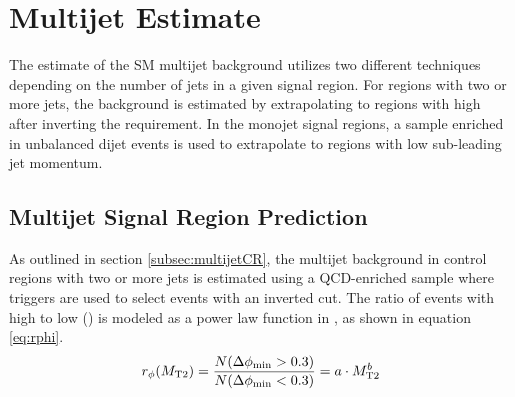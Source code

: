 \section{Multijet Estimate}
\label{sec:qcd}

The estimate of the SM multijet background utilizes two different techniques depending on the number of jets in a given signal region. For regions with two or more jets, the background is estimated by extrapolating to regions with high \dphimin after inverting the \dphimin requirement. In the monojet signal regions, a sample enriched in unbalanced dijet events is used to extrapolate to regions with low sub-leading jet momentum.

\subsection{Multijet Signal Region Prediction}
\label{subsec:qcdMultijet}

As outlined in section \ref{subsec:multijetCR}, the multijet background in control regions with two or more jets is estimated using a QCD-enriched sample where \HT triggers are used to select events with an inverted \dphimin cut. The ratio of events with high to low \dphimin (\rphi) is modeled as a power law function in \mttwo, as shown in equation \ref{eq:rphi}. 
\begin{equation}
	r_{\phi}(M_{\mathrm{T2}}) = \frac{N(\Delta\phi_{\mathrm{min}} > 0.3)}{N(\Delta\phi_{\mathrm{min}} < 0.3)} = a \cdot M_{\mathrm{T2}}^b
	\label{eq:rphi}
\end{equation}

